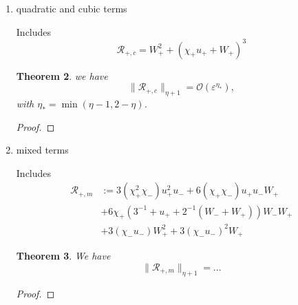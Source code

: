 \documentclass[letterpaper,11pt]{article}
\newcommand{\rmO}{\mathcal{O}}
\newcommand{\eps}{\varepsilon}
\numberwithin{equation}{section}
\theoremstyle{plain}
\newtheorem{theorem}{Theorem}[section]
\begin{document}
\begin{enumerate}
\begin{itemize}
\begin{enumerate}
Includes
\[
\mathcal{R}_{+,d} := 2\chi_-(u_- - u_+)W_+ + (\chi_-\chi_+)u_+(u_- - u_+) + \frac{1}{2}\chi_+'(u_- - u_+)
\]

\begin{theorem}
The difference term $\mathcal{R}_{+,d}$ satisfies
\[
\|\mathcal{R}_{+,d} \|_{\eta+1}  = \rmO()
\]
\end{theorem}

\begin{proof}

\end{proof}

\item quadratic and cubic terms

Includes
\[
\mathcal{R}_{+,c} = W_+^2 + (\chi_+u_+ + W_+)^3
\]

\begin{theorem}
we have
\[
\| \mathcal{R}_{+,c} \|_{\eta+1} = \rmO(\eps^{\eta_*}),
\]
with $\eta_* = \min(\eta-1, 2-\eta)$.
\end{theorem}

\begin{proof}

\end{proof}
\item mixed terms

Includes
\begin{align*}
\mathcal{R}_{+,m} &:=3(\chi_+^2\chi_-)u_+^2u_- + 6(\chi_+\chi_-)u_+ u_- W_+\\
&+6\chi_+(3^{-1} + u_+ + 2^{-1}(W_-+W_+))W_-W_+\\
&+ 3(\chi_-u_-)W_+^2 + 3(\chi_-u_-)^2W_+
\end{align*}

 \begin{theorem}
 We have
 \[
 \|\mathcal{R}_{+,m}\|_{\eta+1} = ...
 \]
 \end{theorem}
 
 \begin{proof}

 \end{proof}
\end{enumerate}

\end{itemize}

\end{enumerate}
\end{document}
